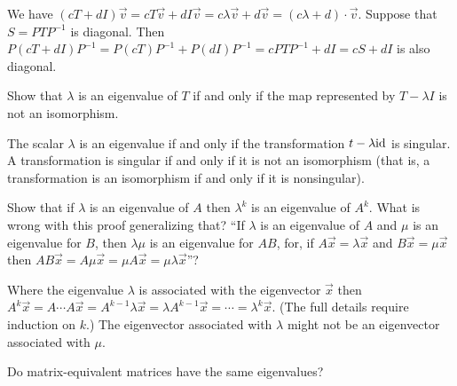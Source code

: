 \begin{exercises}
    \begin{answer}
      \begin{exparts}
        \partsitem We have 
          $(cT+dI)\vec{v}=cT\vec{v}+dI\vec{v}=c\lambda\vec{v}+d\vec{v}
               =(c\lambda+d)\cdot \vec{v}$.
        \partsitem Suppose that $S=PTP^{-1}$ is diagonal.
          Then $P(cT+dI)P^{-1}=P(cT)P^{-1}+P(dI)P^{-1}
                 =cPTP^{-1}+dI=cS+dI$ is also diagonal.
      \end{exparts}
    \end{answer}
  \recommended \item
    Show that \( \lambda \) is an eigenvalue of \( T \) if and only if the map
    represented by \( T-\lambda I \) is not an isomorphism.
    \begin{answer}
      The scalar $\lambda$ is an eigenvalue if and only if the transformation
      $t-\lambda \mbox{id}$ is singular.
      A transformation is singular if and only if it is not an isomorphism
      (that is, a transformation is an isomorphism if and only if it is
      nonsingular).
    \end{answer}
  \item \cite{Strang} 
    \begin{exparts}
      \partsitem Show that if \( \lambda \) is an eigenvalue of \( A \)
         then \( \lambda^k \) is an eigenvalue of \( A^k \).
      \partsitem What is wrong with this proof generalizing that?
         ``If \( \lambda \) is an eigenvalue of \( A \) and \( \mu \) is
         an eigenvalue for \( B \), then \( \lambda\mu \) is an eigenvalue
         for \( AB \), for, if \( A\vec{x}=\lambda\vec{x} \) and
         \( B\vec{x}=\mu\vec{x} \) then
         \( AB\vec{x}=A\mu\vec{x}=\mu A\vec{x}=\mu\lambda\vec{x} \)''?
    \end{exparts}
    \begin{answer}
      \begin{exparts}
        \partsitem Where the eigenvalue $\lambda$ is associated with the
          eigenvector $\vec{x}$ then
          $A^k\vec{x}=A\cdots A\vec{x}=A^{k-1}\lambda\vec{x}
            =\lambda A^{k-1}\vec{x}=\cdots=\lambda^k\vec{x}$.
          (The full details require induction on $k$.)
        \partsitem The eigenvector associated with $\lambda$
          might not be an eigenvector associated with $\mu$.
      \end{exparts}
    \end{answer}
  \item 
    Do matrix-equivalent matrices have the same eigenvalues?

\end{exercises}
